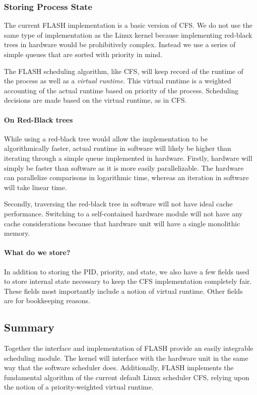 \documentclass{sig-alternate-10pt}
\begin{document}
\subsubsection{Storing Process State}
The current FLASH implementation is a basic version of CFS.  We do not use
the same type of implementation as the Linux kernel because implementing
red-black trees in hardware would be prohibitively complex.  Instead we use
a series of simple queues that are sorted with priority in mind.

The FLASH scheduling algorithm, like CFS, will keep record of the runtime of
the process as well as a \emph{virtual runtime}.  This virtual runtime is a
weighted accounting of the actual runtime based on priority of the process.
Scheduling decisions are made based on the virtual runtime, as in CFS.

\paragraph{On Red-Black trees}
While using a red-black tree would allow the implementation to be
algorithmically faster, actual runtime in software will likely be higher
than iterating through a simple queue implemented in hardware.  Firstly,
hardware will simply be faster than software as it is more easily
parallelizable.  The hardware can parallelize comparisons in logarithmic
time, whereas an iteration in software will take linear time.

Secondly, traversing the red-black tree in software will not have ideal cache
performance. Switching to a self-contained hardware module will not have any
cache considerations because that hardware unit will have a single
monolithic memory.

\paragraph{What do we store?}
In addition to storing the PID, priority, and state, we also have a few
fields used to store internal state necessary to keep the CFS implementation
completely fair.  These fields most importantly include a notion of virtual
runtime.  Other fields are for bookkeeping reasons.

\subsection{Summary}
Together the interface and implementation of FLASH provide an easily
integrable scheduling module.  The kernel will interface with the hardware
unit in the same way that the software scheduler does.  Additionally, FLASH
implements the fundamental algorithm of the current default Linux scheduler
CFS, relying upon the notion of a priority-weighted virtual runtime.
\end{document}

